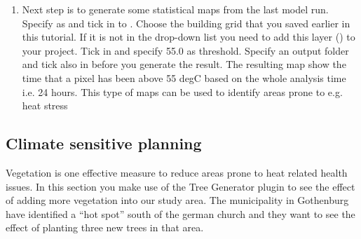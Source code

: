 \documentclass[letterpaper,10pt,english]{sphinxmanual}
\begin{document}
\begin{enumerate}
\item {} 
Next step is to generate some statistical maps from the last model
run. Specify  as 
and tick in to . Choose the building grid
that you saved earlier in this tutorial. If it is not in the
drop-down list you need to add this layer () to your
project. Tick in  and specify 55.0 as threshold. Specify an output folder and
tick also in  before you generate the
result. The resulting map show the time that a pixel has been above
55 degC based on the whole analysis time i.e. 24 hours. This type of
maps can be used to identify areas prone to e.g. heat stress

\end{enumerate}


\subsection{Climate sensitive planning}
\label{\detokenize{Tutorials/IntroductionToSolweig:climate-sensitive-planning}}
Vegetation is one effective measure to reduce areas prone to heat
related health issues. In this section you make use of the Tree
Generator plugin to see the effect of adding more vegetation into our
study area. The municipality in Gothenburg have identified a “hot spot”
south of the german church and they want to see the effect of planting
three new trees in that area.
\end{document}
